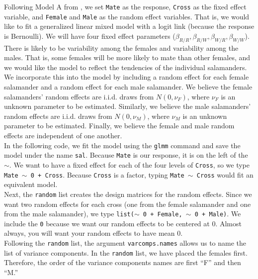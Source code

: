 \documentclass[article]{jss}
\begin{document}
  Following Model A from \citet{karim:zeger:1992}, we set \texttt{Mate} as the response, \texttt{Cross} as the fixed effect variable, and \texttt{Female} and \texttt{Male} as the random effect variables. That is, we would like to fit a generalized linear mixed model with a logit link (because the response is Bernoulli). We will have four fixed effect parameters ($\beta_{R/R}, \beta_{R/W},\beta_{W/R},\beta_{W/W}$). There is likely to be variability among the females and variability among the males. That is, some females will be more likely to mate than other females, and we would like the model to reflect the tendencies of the individual salamanders. We incorporate this into the model by including a random effect for each female salamander and a random effect for each male salamander. We believe the female salamanders' random effects are i.i.d. draws from $N(0, \nu_F)$, where $\nu_F$ is an unknown parameter to be estimated. Similarly, we believe the male salamanders' random effects are i.i.d. draws from $N(0,\nu_M)$, where $\nu_M$ is an unknown parameter to be estimated. Finally, we believe the female and male random effects are independent of one another. \\




In the following code, we  fit the model using the \texttt{glmm} command and save the model under the name  \texttt{sal}. Because \texttt{Mate} is our response, it is on the left of the $\sim$. We want to have a fixed effect for each of the four levels of \texttt{Cross}, so we type \texttt{Mate $\sim$ 0 + Cross}. Because \texttt{Cross} is a factor, typing \texttt{Mate $\sim$ Cross} would fit an equivalent model. \\ 

Next, the \texttt{random} list creates the design matrices for the random effects. Since we want two random effects for each cross (one from the female salamander and one from the male salamander), we type \texttt{list($\sim$ 0 + Female, $\sim$ 0 + Male)}. We  include the \texttt{0} because we want our random effects to be centered at 0. Almost always, you will want your random effects to have mean 0. \\

 Following the \texttt{random} list, the argument \texttt{varcomps.names} allows us to name the list of variance components. In the \texttt{random} list, we have placed the females first. Therefore, the order of the variance components names are first ``F'' and then ``M.''  \\
\end{document}
